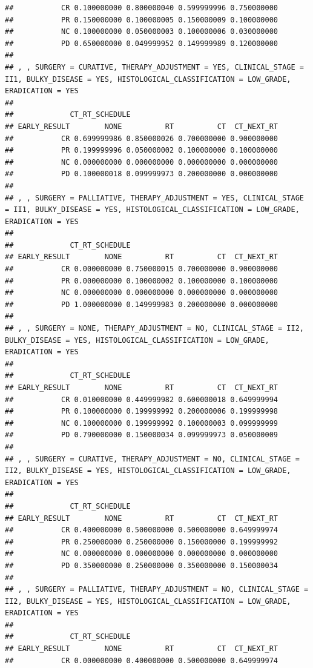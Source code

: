 \documentclass[]{article}
\begin{document}
\begin{verbatim}
##           CR 0.100000000 0.800000040 0.599999996 0.750000000
##           PR 0.150000000 0.100000005 0.150000009 0.100000000
##           NC 0.100000000 0.050000003 0.100000006 0.030000000
##           PD 0.650000000 0.049999952 0.149999989 0.120000000
## 
## , , SURGERY = CURATIVE, THERAPY_ADJUSTMENT = YES, CLINICAL_STAGE = II1, BULKY_DISEASE = YES, HISTOLOGICAL_CLASSIFICATION = LOW_GRADE, ERADICATION = YES
## 
##             CT_RT_SCHEDULE
## EARLY_RESULT        NONE          RT          CT  CT_NEXT_RT
##           CR 0.699999986 0.850000026 0.700000000 0.900000000
##           PR 0.199999996 0.050000002 0.100000000 0.100000000
##           NC 0.000000000 0.000000000 0.000000000 0.000000000
##           PD 0.100000018 0.099999973 0.200000000 0.000000000
## 
## , , SURGERY = PALLIATIVE, THERAPY_ADJUSTMENT = YES, CLINICAL_STAGE = II1, BULKY_DISEASE = YES, HISTOLOGICAL_CLASSIFICATION = LOW_GRADE, ERADICATION = YES
## 
##             CT_RT_SCHEDULE
## EARLY_RESULT        NONE          RT          CT  CT_NEXT_RT
##           CR 0.000000000 0.750000015 0.700000000 0.900000000
##           PR 0.000000000 0.100000002 0.100000000 0.100000000
##           NC 0.000000000 0.000000000 0.000000000 0.000000000
##           PD 1.000000000 0.149999983 0.200000000 0.000000000
## 
## , , SURGERY = NONE, THERAPY_ADJUSTMENT = NO, CLINICAL_STAGE = II2, BULKY_DISEASE = YES, HISTOLOGICAL_CLASSIFICATION = LOW_GRADE, ERADICATION = YES
## 
##             CT_RT_SCHEDULE
## EARLY_RESULT        NONE          RT          CT  CT_NEXT_RT
##           CR 0.010000000 0.449999982 0.600000018 0.649999994
##           PR 0.100000000 0.199999992 0.200000006 0.199999998
##           NC 0.100000000 0.199999992 0.100000003 0.099999999
##           PD 0.790000000 0.150000034 0.099999973 0.050000009
## 
## , , SURGERY = CURATIVE, THERAPY_ADJUSTMENT = NO, CLINICAL_STAGE = II2, BULKY_DISEASE = YES, HISTOLOGICAL_CLASSIFICATION = LOW_GRADE, ERADICATION = YES
## 
##             CT_RT_SCHEDULE
## EARLY_RESULT        NONE          RT          CT  CT_NEXT_RT
##           CR 0.400000000 0.500000000 0.500000000 0.649999974
##           PR 0.250000000 0.250000000 0.150000000 0.199999992
##           NC 0.000000000 0.000000000 0.000000000 0.000000000
##           PD 0.350000000 0.250000000 0.350000000 0.150000034
## 
## , , SURGERY = PALLIATIVE, THERAPY_ADJUSTMENT = NO, CLINICAL_STAGE = II2, BULKY_DISEASE = YES, HISTOLOGICAL_CLASSIFICATION = LOW_GRADE, ERADICATION = YES
## 
##             CT_RT_SCHEDULE
## EARLY_RESULT        NONE          RT          CT  CT_NEXT_RT
##           CR 0.000000000 0.400000000 0.500000000 0.649999974

\end{verbatim}
\end{document}
